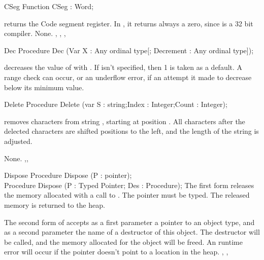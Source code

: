 
\begin{function}{CSeg}
\Declaration
Function CSeg  : Word;

\Description
{} returns the Code segment register. In \fpc, it returns always a
zero, since \fpc is a 32 bit compiler.
\Errors
None.
\SeeAlso
{}, , , 
\end{function}


\begin{procedure}{Dec}
\Declaration
Procedure Dec (Var X : Any ordinal type[; Decrement : Any ordinal type]);

\Description
{} decreases the value of  with .
If  isn't specified, then 1 is taken as a default.
\Errors
A range check can occur, or an underflow error, if an attempt it made
to decrease  below its minimum value.
\SeeAlso
{}
\end{procedure}


\begin{procedure}{Delete}
\Declaration
Procedure Delete (var S : string;Index : Integer;Count : Integer);

\Description
{} removes  characters from string , starting
at position . All characters after the delected characters are
shifted  positions to the left, and the length of the string is adjusted.

\Errors
None.
\SeeAlso
{},,
\end{procedure}


\begin{procedure}{Dispose}
\Declaration
Procedure Dispose (P : pointer);\\
Procedure Dispose (P : Typed Pointer; Des : Procedure);
\Description
The first form  releases the memory allocated with a call to
. The pointer  must be typed. The released memory is
returned to the heap.

The second form of  accepts as a first parameter a pointer
to an object type, and as a second parameter the name of a destructor
of this object. The destructor will be called, and the memory allocated
for the object will be freed.
\Errors
An runtime error will occur if the pointer doesn't point to a location in the
heap.
\SeeAlso
{}, , 
\end{procedure}

